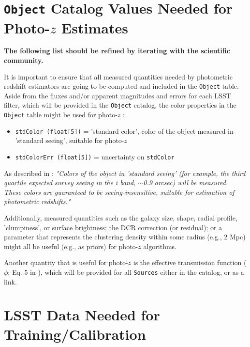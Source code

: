 \documentclass[DM,lsstdraft,toc]{lsstdoc}
\begin{document}
\clearpage
\section{{\tt Object} Catalog Values Needed for Photo-$z$ Estimates}\label{sec:objvals}

{\bf The following list should be refined by iterating with the scientific community.}

It is important to ensure that all measured quantities needed by photometric redshift estimators are going to be computed and included in the {\tt Object} table. 
Aside from the fluxes and/or apparent magnitudes and errors for each LSST filter, which will be provided in the {\tt Object} catalog, the color properties in the {\tt Object} table might be used for photo-$z$ : 

\begin{itemize}%
\item \texttt{stdColor (float[5])} = 'standard color', color of the object measured in 'standard seeing', suitable for photo-$z$
\item \texttt{stdColorErr (float[5])} = uncertainty on \texttt{stdColor}
\end{itemize}

As described in : {\it "Colors of the object in 'standard seeing' (for example, the third quartile expected survey seeing in the i band, $\sim$0.9 arcsec) will be measured. These colors are guaranteed to be seeing-insensitive, suitable for estimation of photometric redshifts."}

Additionally, measured quantities such as the galaxy size, shape, radial profile, 'clumpiness', or surface brightness; the DCR correction (or residual); or a parameter that represents the clustering density within some radius (e.g., 2 Mpc) might all be useful (e.g., as priors) for photo-$z$ algorithms. 

Another quantity that is useful for photo-$z$ is the effective transmission function ($\phi$; Eq. 5 in ), which will be provided for all {\tt Sources} either in the catalog, or as a link.





\clearpage
\section{LSST Data Needed for Training/Calibration}\label{sec:calib}
\end{document}
